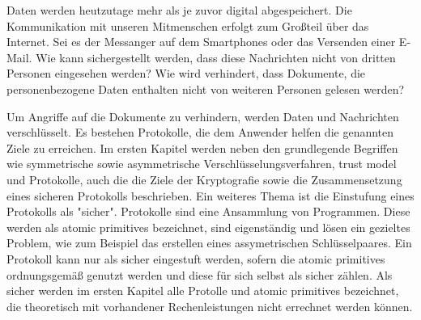 Daten werden heutzutage mehr als je zuvor digital abgespeichert. Die
Kommunikation mit unseren Mitmenschen erfolgt zum Großteil über das Internet.
Sei es der Messanger auf dem Smartphones oder das Versenden einer E-Mail.  Wie
kann sichergestellt werden, dass diese Nachrichten nicht von dritten Personen
eingesehen werden? Wie wird verhindert, dass Dokumente, die personenbezogene
Daten enthalten nicht von weiteren Personen gelesen werden?

Um Angriffe auf die Dokumente zu verhindern, werden Daten und Nachrichten
verschlüsselt. Es bestehen Protokolle, die dem Anwender helfen die genannten
Ziele zu erreichen.  Im ersten Kapitel \cite{modern} werden neben den
grundlegende Begriffen wie symmetrische sowie asymmetrische
Verschlüsselungsverfahren, trust model und Protokolle, auch die die Ziele der
Kryptografie sowie die Zusammensetzung eines sicheren Protokolls beschrieben.
Ein weiteres Thema ist die Einstufung eines Protokolls als "sicher".
Protokolle sind eine Ansammlung von Programmen. Diese werden als atomic
primitives bezeichnet, sind eigenständig und lösen ein gezieltes Problem, wie
zum Beispiel das erstellen eines assymetrischen Schlüsselpaares. Ein Protokoll
kann nur als sicher eingestuft werden, sofern die atomic primitives
ordnungsgemäß genutzt werden und diese für sich selbst als sicher zählen. Als
sicher werden im ersten Kapitel \cite{modern} alle Protolle und atomic
primitives bezeichnet, die theoretisch mit vorhandener Rechenleistungen nicht
errechnet werden können.

